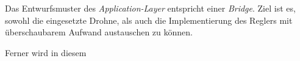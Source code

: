 




Das Entwurfsmuster des \textit{Application-Layer} entspricht einer \textit{Bridge}. Ziel ist es, sowohl die eingesetzte Drohne, als auch die Implementierung des Reglers mit überschaubarem Aufwand austauschen zu können.

Ferner wird in diesem \Pack


















